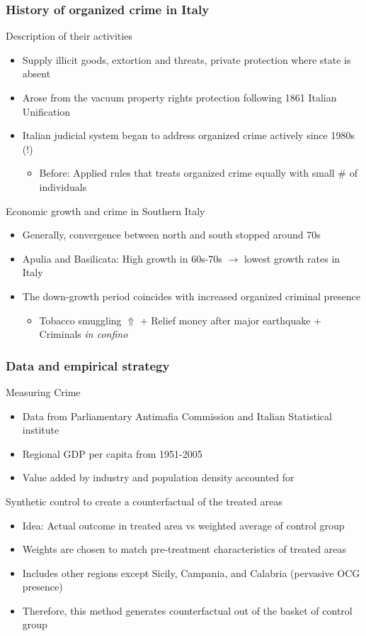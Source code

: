 \documentclass[aspectratio=169]{beamer}
\begin{document}
\begin{frame}
\frametitle{History of organized crime in Italy} 
Description of their activities
\begin{itemize}\setlength\itemsep{3pt}
\item  Supply illicit goods, extortion and threats, private protection where state is absent
\item Arose from the vacuum property rights protection following 1861 Italian Unification
\item Italian judicial system began to address organized crime actively since 1980s (!)
\begin{itemize}
  \item Before: Applied rules that treats organized crime equally with small \# of individuals
\end{itemize}
\end{itemize}\medskip
Economic growth and crime in Southern Italy
\begin{itemize}\setlength\itemsep{3pt}
  \item Generally, convergence between north and south stopped around 70s
  \item Apulia and Basilicata: High growth in 60s-70s $\to$ lowest growth rates in Italy
  \item The down-growth period coincides with increased organized criminal presence
 \begin{itemize} 
  \item Tobacco smuggling $\Uparrow$ + Relief money after major earthquake + Criminals \textit{in confino}
\end{itemize}
\end{itemize}
\end{frame}

\begin{frame}
\frametitle{Data and empirical strategy} 
Measuring Crime
\begin{itemize}\setlength\itemsep{3pt}
\item Data from Parliamentary Antimafia Commission and Italian Statistical institute
\item Regional GDP per capita from 1951-2005
\item Value added by industry and population density accounted for
\end{itemize}\medskip
Synthetic control to create a counterfactual of the treated areas
\begin{itemize}\setlength\itemsep{3pt}
  \item Idea: Actual outcome in treated area vs weighted average of control group
  \item Weights are chosen to match pre-treatment characteristics of treated areas
  \item Includes other regions except Sicily, Campania, and Calabria (pervasive OCG presence) 
  \item Therefore, this method generates counterfactual out of the basket of control group
\end{itemize}
\end{frame}
\end{document}
